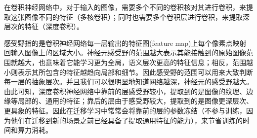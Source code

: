 


在卷积神经网络中，对于输入的图像，需要多个不同的卷积核对其进行卷积，来提取这张图像不同的特征（多核卷积）；同时也需要多个卷积层进行卷积，来提取深层次的特征（深度卷积）。

感受野指的是卷积神经网络每一层输出的特征图(feature map)上每个像素点映射回输入图像上的区域大小。神经元感受野的范围越大表示其能接触到的原始图像范围就越大，也意味着它能学习更为全局，语义层次更高的特征信息；相反，范围越小则表示其所包含的特征越趋向局部和细节。因此感受野的范围可以用来大致判断每一层的抽象层次。并且我们可以很明显地知道网络越深，神经元的感受野越大。由此可知，深度卷积神经网络中靠前的层感受野较小，提取到的是图像的纹理、边缘等局部的、通用的特征；靠后的层由于感受野较大，提取到的是图像更深层次、更具象的特征。因此在迁移学习中常常会将靠前的层的参数冻结（不参与训练，因为他们在迁移到新的场景之前已经具备了提取通用特征的能力），来节省训练的时间和算力消耗。


